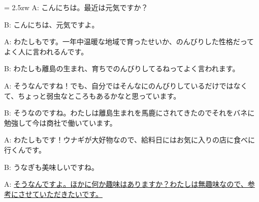 \documentclass[11pt]{amsart}
\title{}
\author{}
\newenvironment{hangall}[1]{\hangindent = 2.5zw\everypar{\hangindent = 2.5zw}}{}
\begin{document}
\maketitle
\begin{hangall}{}%
A: こんにちは。最近は元気ですか？

B: こんにちは、元気ですよ。

A: わたしもです。一年中温暖な地域で育ったせいか、のんびりした性格だってよく人に言われるんです。

B: わたしも離島の生まれ、育ちでのんびりしてるねってよく言われます。

A: そうなんですね！でも、自分ではそんなにのんびりしているだけではなくて、ちょっと弱虫なところもあるかなと思っています。

B: そうなのですね。わたしは離島生まれを馬鹿にされてきたのでそれをバネに勉強して今は商社で働いています。

A: わたしもです！ウナギが大好物なので、給料日にはお気に入りの店に食べに行くんです。

B: うなぎも美味しいですね。

A: \ul{そうなんですよ。ほかに何か趣味はありますか？わたしは無趣味なので、参考にさせていただきたいです。}\end{hangall}
\end{document}
